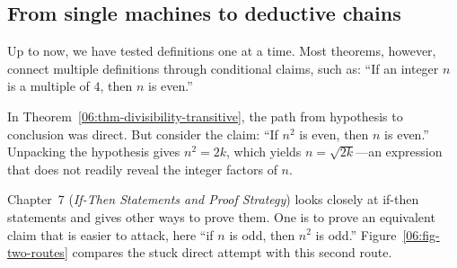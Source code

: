 \subsection{From single machines to deductive chains}

Up to now, we have tested definitions one at a time. Most theorems, however, connect multiple definitions through conditional claims, such as: ``If an integer $n$ is a multiple of $4$, then $n$ is even.''

In Theorem~\ref{06:thm-divisibility-transitive}, the path from hypothesis to conclusion was direct. But consider the claim: ``If $n^2$ is even, then $n$ is even.'' Unpacking the hypothesis gives $n^2 = 2k$, which yields $n = \sqrt{2k}$---an expression that does not readily reveal the integer factors of $n$.

Chapter~7 (\emph{If-Then Statements and Proof Strategy}) looks closely at if-then statements and gives other ways to prove them. One is to prove an equivalent claim that is easier to attack, here ``if $n$ is odd, then $n^2$ is odd.'' Figure~\ref{06:fig-two-routes} compares the stuck direct attempt with this second route.

